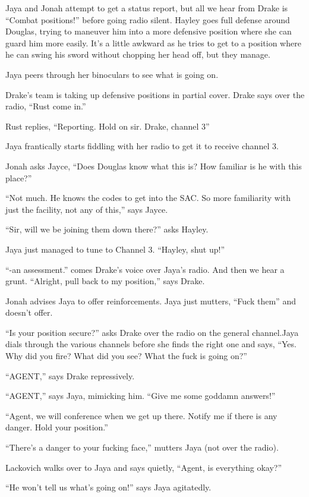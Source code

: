 Jaya and Jonah attempt to get a status report, but all we hear from Drake is ``Combat positions!'' before going radio silent.  Hayley goes full defense around Douglas, trying to maneuver him into a more defensive position where she can guard him more easily.  It's a little awkward as he tries to get to a position where he can swing his sword without chopping her head off, but they manage.

Jaya peers through her binoculars to see what is going on.

Drake's team is taking up defensive positions in partial cover.  Drake says over the radio, ``Rust come in.''  

Rust replies, ``Reporting.  Hold on sir.  Drake, channel 3''  

Jaya frantically starts fiddling with her radio to get it to receive channel 3.

Jonah asks Jayce, ``Does Douglas know what this is?  How familiar is he with this place?''

``Not much.  He knows the codes to get into the SAC.  So more familiarity with just the facility, not any of this,'' says Jayce.

``Sir, will we be joining them down there?'' asks Hayley.

Jaya just managed to tune to Channel 3.  ``Hayley, shut up!''

``-an assessment.'' comes Drake's voice over Jaya's radio.  And then we hear a grunt.  ``Alright, pull back to my position,'' says Drake.

Jonah advises Jaya to offer reinforcements.  Jaya just mutters, ``Fuck them'' and doesn't offer.

``Is your position secure?'' asks Drake over the radio on the general channel.Jaya dials through the various channels before she finds the right one and says, ``Yes.  Why did you fire?  What did you see?  What the fuck is going on?''

``AGENT,'' says Drake repressively.

``AGENT,'' says Jaya, mimicking him.  ``Give me some goddamn answers!''

``Agent, we will conference when we get up there. Notify me if there is any danger.  Hold your position.''

``There's a danger to your fucking face,'' mutters Jaya (not over the radio).

Lackovich walks over to Jaya and says quietly, ``Agent, is everything okay?''

``He won't tell us what's going on!'' says Jaya agitatedly.

